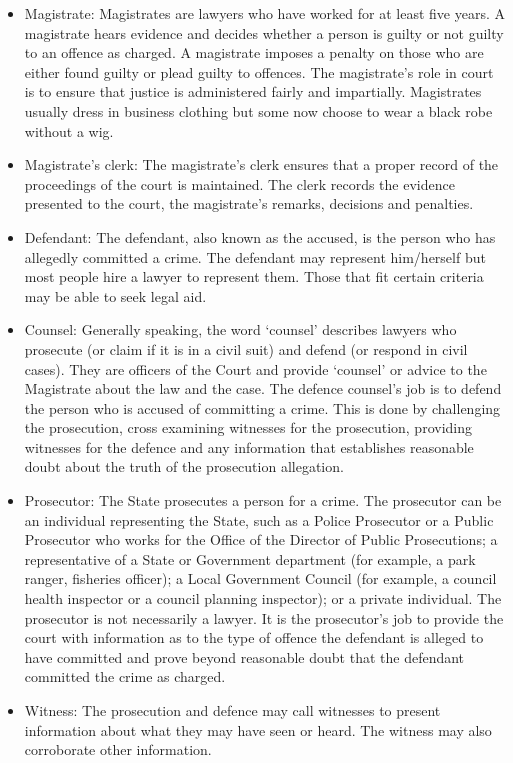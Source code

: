 \begin{itemize}
  \itemsep0em
  \item Magistrate: Magistrates are lawyers who have worked for at least five years. A magistrate hears evidence and decides whether a person is guilty or not guilty to an offence as charged. A magistrate imposes a penalty on those who are either found guilty or plead guilty to offences. The magistrate's role in court is to ensure that justice is administered fairly and impartially. Magistrates usually dress in business clothing but some now choose to wear a black robe without a wig.
  \item Magistrate's clerk: The magistrate's clerk ensures that a proper record of the proceedings of the court is maintained. The clerk records the evidence presented to the court, the magistrate's remarks, decisions and penalties.
  \item Defendant: The defendant, also known as the accused, is the person who has allegedly committed a crime. The defendant may represent him/herself but most people hire a lawyer to represent them. Those that fit certain criteria may be able to seek legal aid.
  \item Counsel: Generally speaking, the word ‘counsel’ describes lawyers who prosecute (or claim if it is in a civil suit) and defend (or respond in civil cases). They are officers of the Court and provide ‘counsel’ or advice to the Magistrate about the law and the case. The defence counsel’s job is to defend the person who is accused of committing a crime. This is done by challenging the prosecution, cross examining witnesses for the prosecution, providing witnesses for the defence and any information that establishes reasonable doubt about the truth of the prosecution allegation.
  \item Prosecutor: The State prosecutes a person for a crime. The prosecutor can be an individual representing the State, such as a Police Prosecutor or a Public Prosecutor who works for the Office of the Director of Public Prosecutions; a representative of a State or Government department (for example, a park ranger, fisheries officer); a Local Government Council (for example, a council health inspector or a council planning inspector); or a private individual. The prosecutor is not necessarily a lawyer.  It is the prosecutor's job to provide the court with information as to the type of offence the defendant is alleged to have committed and prove beyond reasonable doubt that the defendant committed the crime as charged.
  \item Witness: The prosecution and defence may call witnesses to present information about what they may have seen or heard. The witness may also corroborate other information.

\end{itemize}
